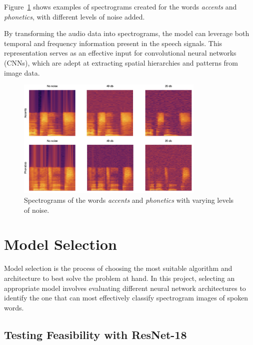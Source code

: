 \documentclass[12pt]{article}
\begin{document}
Figure~\ref{fig:spectrograms} shows examples of spectrograms created for the words \textit{accents} and \textit{phonetics}, with different levels of noise added.

By transforming the audio data into spectrograms, the model can leverage both temporal and frequency information present in the speech signals. This representation serves as an effective input for convolutional neural networks (CNNs), which are adept at extracting spatial hierarchies and patterns from image data.

\begin{figure}[h]
\centering
\includegraphics[width=0.8\textwidth]{spectrograms.png}
\caption{Spectrograms of the words \textit{accents} and \textit{phonetics} with varying levels of noise.}
\label{fig:spectrograms}
\end{figure}

\clearpage




\section{Model Selection}

Model selection is the process of choosing the most suitable algorithm and architecture to best solve the problem at hand. In this project, selecting an appropriate model involves evaluating different neural network architectures to identify the one that can most effectively classify spectrogram images of spoken words.

\subsection{Testing Feasibility with ResNet-18}
\end{document}
